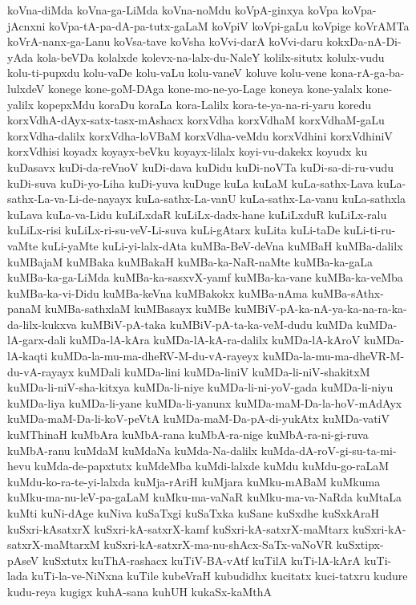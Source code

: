 {koVna-diMda
koVna-ga-LiMda
koVna-noMdu
koVpA-ginxya
koVpa
koVpa-jAcnxni
koVpa-tA-pa-dA-pa-tutx-gaLaM
koVpiV
koVpi-gaLu
koVpige
koVrAMTa
koVrA-nanx-ga-Lanu
koVsa-tave
koVsha
koVvi-darA
koVvi-daru
kokxDa-nA-Di-yAda
kola-beVDa
kolalxde
kolevx-na-lalx-du-NaleY
kolilx-situtx
kolulx-vudu
kolu-ti-pupxdu
kolu-vaDe
kolu-vaLu
kolu-vaneV
koluve
kolu-vene
kona-rA-ga-ba-lulxdeV
konege
kone-goM-DAga
kone-mo-ne-yo-Lage
koneya
kone-yalalx
kone-yalilx
kopepxMdu
koraDu
koraLa
kora-Lalilx
kora-te-ya-na-ri-yaru
koredu
korxVdhA-dAyx-satx-tasx-mAshacx
korxVdha
korxVdhaM
korxVdhaM-gaLu
korxVdha-dalilx
korxVdha-loVBaM
korxVdha-veMdu
korxVdhini
korxVdhiniV
korxVdhisi
koyadx
koyayx-beVku
koyayx-lilalx
koyi-vu-dakekx
koyudx
ku
kuDasavx
kuDi-da-reVnoV
kuDi-dava
kuDidu
kuDi-noVTa
kuDi-sa-di-ru-vudu
kuDi-suva
kuDi-yo-Liha
kuDi-yuva
kuDuge
kuLa
kuLaM
kuLa-sathx-Lava
kuLa-sathx-La-va-Li-de-nayayx
kuLa-sathx-La-vanU
kuLa-sathx-La-vanu
kuLa-sathxla
kuLava
kuLa-va-Lidu
kuLiLxdaR
kuLiLx-dadx-hane
kuLiLxduR
kuLiLx-ralu
kuLiLx-risi
kuLiLx-ri-su-veV-Li-suva
kuLi-gAtarx
kuLita
kuLi-taDe
kuLi-ti-ru-vaMte
kuLi-yaMte
kuLi-yi-lalx-dAta
kuMBa-BeV-deVna
kuMBaH
kuMBa-dalilx
kuMBajaM
kuMBaka
kuMBakaH
kuMBa-ka-NaR-naMte
kuMBa-ka-gaLa
kuMBa-ka-ga-LiMda
kuMBa-ka-sasxvX-yamf
kuMBa-ka-vane
kuMBa-ka-veMba
kuMBa-ka-vi-Didu
kuMBa-keVna
kuMBakokx
kuMBa-nAma
kuMBa-sAthx-panaM
kuMBa-sathxlaM
kuMBasayx
kuMBe
kuMBiV-pA-ka-nA-ya-ka-na-ra-ka-da-lilx-kukxva
kuMBiV-pA-taka
kuMBiV-pA-ta-ka-veM-dudu
kuMDa
kuMDa-lA-garx-dali
kuMDa-lA-kAra
kuMDa-lA-kA-ra-dalilx
kuMDa-lA-kAroV
kuMDa-lA-kaqti
kuMDa-la-mu-ma-dheRV-M-du-vA-rayeyx
kuMDa-la-mu-ma-dheVR-M-du-vA-rayayx
kuMDali
kuMDa-lini
kuMDa-liniV
kuMDa-li-niV-shakitxM
kuMDa-li-niV-sha-kitxya
kuMDa-li-niye
kuMDa-li-ni-yoV-gada
kuMDa-li-niyu
kuMDa-liya
kuMDa-li-yane
kuMDa-li-yanunx
kuMDa-maM-Da-la-hoV-mAdAyx
kuMDa-maM-Da-li-koV-peVtA
kuMDa-maM-Da-pA-di-yukAtx
kuMDa-vatiV
kuMThinaH
kuMbAra
kuMbA-rana
kuMbA-ra-nige
kuMbA-ra-ni-gi-ruva
kuMbA-ranu
kuMdaM
kuMdaNa
kuMda-Na-dalilx
kuMda-dA-roV-gi-su-ta-mi-hevu
kuMda-de-papxtutx
kuMdeMba
kuMdi-lalxde
kuMdu
kuMdu-go-raLaM
kuMdu-ko-ra-te-yi-lalxda
kuMja-rAriH
kuMjara
kuMku-mABaM
kuMkuma
kuMku-ma-nu-leV-pa-gaLaM
kuMku-ma-vaNaR
kuMku-ma-va-NaRda
kuMtaLa
kuMti
kuNi-dAge
kuNiva
kuSaTxgi
kuSaTxka
kuSane
kuSxdhe
kuSxkAraH
kuSxri-kAsatxrX
kuSxri-kA-satxrX-kamf
kuSxri-kA-satxrX-maMtarx
kuSxri-kA-satxrX-maMtarxM
kuSxri-kA-satxrX-ma-nu-shAcx-SaTx-vaNoVR
kuSxtipx-pAseV
kuSxtutx
kuThA-rashacx
kuTiV-BA-vAtf
kuTilA
kuTi-lA-kArA
kuTi-lada
kuTi-la-ve-NiNxna
kuTile
kubeVraH
kubudidhx
kucitatx
kuci-tatxru
kudure
kudu-reya
kugigx
kuhA-sana
kuhUH
kukaSx-kaMthA
}
